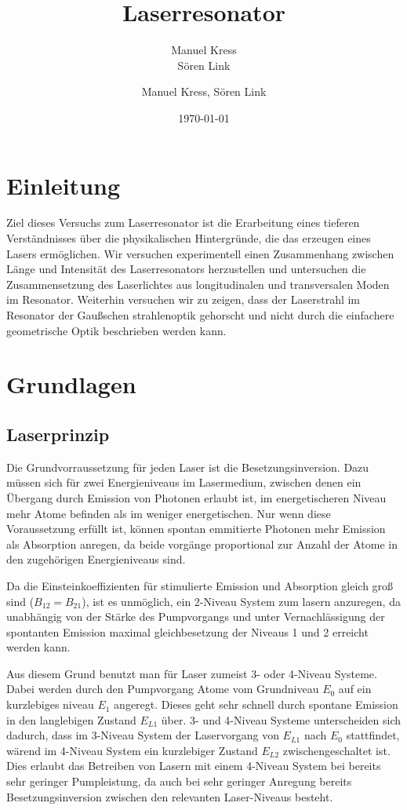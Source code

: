 \documentclass[bigchapter,colorback,accentcolor=tud4b,linedtoc,11pt]{tudreport}
\title{Laserresonator}
\subtitle{Manuel Kress  \\Sören Link}
\author{Manuel Kress, Sören Link}
\date{\today}
\numberwithin{equation}{subsection}
\begin{document}

\maketitle

\tableofcontents


\chapter{Einleitung}
Ziel dieses Versuchs zum Laserresonator ist die Erarbeitung eines tieferen Verständnisses über die physikalischen Hintergründe, die das erzeugen eines Lasers ermöglichen.
Wir versuchen experimentell einen Zusammenhang zwischen Länge und Intensität des Laserresonators herzustellen und untersuchen die Zusammensetzung des Laserlichtes aus longitudinalen und transversalen Moden im Resonator. Weiterhin versuchen wir zu zeigen, dass der Laserstrahl im Resonator der Gaußschen strahlenoptik gehorscht und nicht durch die einfachere geometrische Optik beschrieben werden kann.
\chapter{Grundlagen}
\section{Laserprinzip}
Die Grundvorraussetzung für jeden Laser ist die Besetzungsinversion. Dazu müssen sich für zwei Energieniveaus im Lasermedium, zwischen denen ein Übergang durch Emission von Photonen erlaubt ist, im energetischeren Niveau mehr Atome befinden als im weniger energetischen. Nur wenn diese Voraussetzung erfüllt ist, können spontan emmitierte Photonen mehr Emission als Absorption anregen, da beide vorgänge proportional zur Anzahl der Atome in den zugehörigen Energieniveaus sind.

Da die Einsteinkoeffizienten für stimulierte Emission und Absorption gleich groß sind ($B_{12}=B_{21}$), ist es unmöglich, ein 2-Niveau System zum lasern anzuregen, da unabhängig von der Stärke des Pumpvorgangs und unter Vernachlässigung der spontanten Emission maximal gleichbesetzung der Niveaus 1 und 2 erreicht werden kann.

Aus diesem Grund benutzt man für Laser zumeist 3- oder 4-Niveau Systeme. Dabei werden durch den Pumpvorgang Atome vom Grundniveau $E_0$ auf ein kurzlebiges niveau $E_1$ angeregt. Dieses geht sehr schnell durch spontane Emission in den langlebigen Zustand $E_{L1}$ über. 3- und 4-Niveau Systeme unterscheiden sich dadurch, dass im 3-Niveau System der Laservorgang von $E_{L1}$ nach $E_{0}$ stattfindet, wärend im 4-Niveau System ein kurzlebiger Zustand $E_{L2}$ zwischengeschaltet ist. Dies erlaubt das Betreiben von Lasern mit einem 4-Niveau System bei bereits sehr geringer Pumpleistung, da auch bei sehr geringer Anregung bereits Besetzungsinversion zwischen den relevanten Laser-Niveaus besteht.
\end{document}
